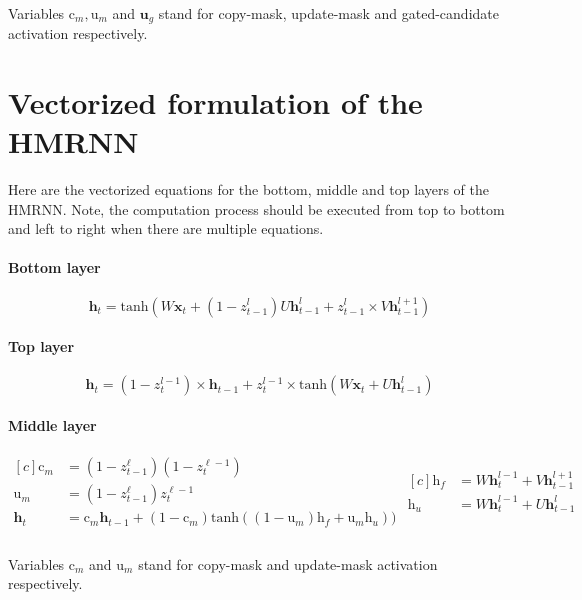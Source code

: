 \paragraph{} Variables $\mathrm{c}_m, \mathrm{u}_m$ and $\mathbf{u}_g$ stand for copy-mask, update-mask and gated-candidate activation respectively.


\section{Vectorized formulation of the HMRNN}
\label{sect:appendix:vectorized_HMRNN}

Here are the vectorized equations for the bottom, middle and top layers of the HMRNN. Note, the computation process should be executed from top to bottom and left to right when there are multiple equations.

\paragraph{Bottom layer}
\begin{equation}
\mathbf{h}_t = \text{tanh}(W \mathbf{x}_t + (1-z^l_{t-1}) U \mathbf{h}^{l}_{t-1} + z^l_{t-1} \times V\mathbf{h}^{l+1}_{t-1})
\end{equation}

\paragraph{Top layer}
\begin{equation}
\mathbf{h}_t = (1-z^{l-1}_t) \times \mathbf{h}_{t-1} + z^{l-1}_t \times  \text{tanh}(W \mathbf{x}_t +  U \mathbf{h}^{l}_{t-1})
\end{equation}

\paragraph{Middle layer}
\begin{equation}
\begin{aligned}[c]
\mathrm{c}_m &= (1 - z^\ell_{t-1})  (1 - z^{\ell-1}_t) \\
\mathrm{u}_m &= (1 - z^\ell_{t-1})   z^{\ell-1}_t \\
\mathbf{h}_t &=  \mathrm{c}_m  \mathbf{h}_{t-1} + (1-\mathrm{c}_m)  \text{tanh}((1-\mathrm{u}_m)  \mathrm{h}_f + \mathrm{u}_m \mathrm{h}_u )) \\
\end{aligned}
\begin{aligned}[c]
\mathrm{h}_f &= W \mathbf{h}^{l-1}_t + V \mathbf{h}^{l+1}_{t-1}\\
\mathrm{h}_u &= W \mathbf{h}^{l-1}_t + U \mathbf{h}^{l}_{t-1} \\
\end{aligned}
\end{equation}
\paragraph{} Variables $\mathrm{c}_m$ and $\mathrm{u}_m$ stand for copy-mask and update-mask activation respectively.
